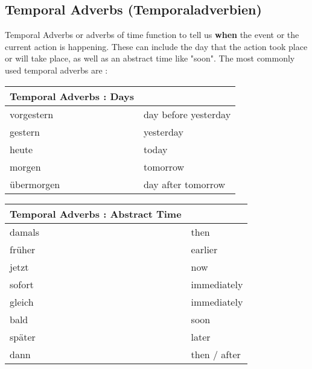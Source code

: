 \documentclass[a4paper,12pt]{article}
\begin{document}
\subsection{\bf{Temporal Adverbs (Temporaladverbien)}}
\begin{adjustwidth}{2em}{0pt}
\label{sec:temporal_adverbs}

Temporal Adverbs or adverbs of time function to tell us \textbf
{when} the event or the current action is happening. These can include the day
that the action took place or will take place, as well as an abstract time like
"soon". The most commonly used temporal adverbs are :

\begin{minipage}{0.45\textwidth}
\vspace{0.3cm}
\begin{tabular}{l|l}
\toprule
\rowcolor{goethe_green}
\multicolumn{2}{c}
{\color{white} \textbf{Temporal Adverbs : Days} \color{black}} \\
\midrule

\rowcolor{white}      vorgestern & day before yesterday \\
\rowcolor{lightgray}  gestern    & yesterday \\
\rowcolor{white}      heute      & today \\
\rowcolor{lightgray}  morgen     & tomorrow\\
\rowcolor{white}      übermorgen & day after tomorrow\\

\bottomrule
\end{tabular}
\vspace{0.3cm}
\newline
\end{minipage}
\begin{minipage}{0.45\textwidth}
\vspace{0.3cm}
\begin{tabular}{l|l}

\toprule
\rowcolor{goethe_green}
\multicolumn{2}{c}
{\color{white} \textbf{Temporal Adverbs : Abstract Time} \color{black}} \\
\midrule

\rowcolor{white}     damals & then \\
\rowcolor{lightgray} früher & earlier \\
\rowcolor{white}     jetzt  & now \\
\rowcolor{lightgray} sofort & immediately \\
\rowcolor{white}     gleich & immediately \\
\rowcolor{lightgray} bald   & soon \\
\rowcolor{white}     später & later \\
\rowcolor{lightgray} dann   & then / after \\



\end{tabular}
\end{minipage}
\end{adjustwidth}
\end{document}

